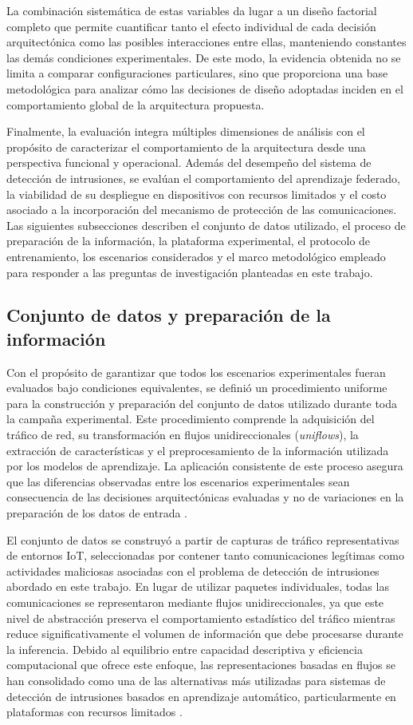 \documentclass[journal,article,submit,moreauthors]{Definitions/mdpi}
\begin{document}
La combinación sistemática de estas variables da lugar a un diseño factorial completo que permite cuantificar tanto el efecto individual de cada decisión arquitectónica como las posibles interacciones entre ellas, manteniendo constantes las demás condiciones experimentales. De este modo, la evidencia obtenida no se limita a comparar configuraciones particulares, sino que proporciona una base metodológica para analizar cómo las decisiones de diseño adoptadas inciden en el comportamiento global de la arquitectura propuesta.

Finalmente, la evaluación integra múltiples dimensiones de análisis con el propósito de caracterizar el comportamiento de la arquitectura desde una perspectiva funcional y operacional. Además del desempeño del sistema de detección de intrusiones, se evalúan el comportamiento del aprendizaje federado, la viabilidad de su despliegue en dispositivos con recursos limitados y el costo asociado a la incorporación del mecanismo de protección de las comunicaciones. Las siguientes subsecciones describen el conjunto de datos utilizado, el proceso de preparación de la información, la plataforma experimental, el protocolo de entrenamiento, los escenarios considerados y el marco metodológico empleado para responder a las preguntas de investigación planteadas en este trabajo.

\subsection{Conjunto de datos y preparación de la información}
Con el propósito de garantizar que todos los escenarios experimentales fueran evaluados bajo condiciones equivalentes, se definió un procedimiento uniforme para la construcción y preparación del conjunto de datos utilizado durante toda la campaña experimental. Este procedimiento comprende la adquisición del tráfico de red, su transformación en flujos unidireccionales (\textit{uniflows}), la extracción de características y el preprocesamiento de la información utilizada por los modelos de aprendizaje. La aplicación consistente de este proceso asegura que las diferencias observadas entre los escenarios experimentales sean consecuencia de las decisiones arquitectónicas evaluadas y no de variaciones en la preparación de los datos de entrada \cite{Hajj2023,Ficco2024}.

El conjunto de datos se construyó a partir de capturas de tráfico representativas de entornos IoT, seleccionadas por contener tanto comunicaciones legítimas como actividades maliciosas asociadas con el problema de detección de intrusiones abordado en este trabajo. En lugar de utilizar paquetes individuales, todas las comunicaciones se representaron mediante flujos unidireccionales, ya que este nivel de abstracción preserva el comportamiento estadístico del tráfico mientras reduce significativamente el volumen de información que debe procesarse durante la inferencia. Debido al equilibrio entre capacidad descriptiva y eficiencia computacional que ofrece este enfoque, las representaciones basadas en flujos se han consolidado como una de las alternativas más utilizadas para sistemas de detección de intrusiones basados en aprendizaje automático, particularmente en plataformas con recursos limitados \cite{Moustafa2019}.
\end{document}
